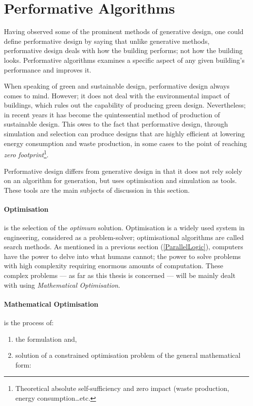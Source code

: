 \clearpage
\section{Performative Algorithms}

Having observed some of the prominent methods of generative design, one could define performative design by saying that unlike generative methods, performative design deals with how the building performs; not how the building looks. Performative algorithms examines a specific aspect of any given building's performance and improves it. 

When speaking of green and sustainable design, performative design always comes to mind. However; it does not deal with the environmental impact of buildings, which rules out the capability of producing green design. Nevertheless; in recent years it has become the quintessential method of production of sustainable design. This owes to the fact that performative design, through simulation and selection can produce designs that are highly efficient at lowering energy consumption and waste production, in some cases to the point of reaching \emph{zero footprint}\footnote{Theoretical absolute self-sufficiency and zero impact (waste production, energy consumption\ldots etc.}.

Performative design differs from generative design in that it does not rely solely on an algorithm for generation, but uses optimisation and simulation as tools. These tools are the main subjects of discussion in this section.

\paragraph{Optimisation}is the selection of the \emph{optimum} solution. Optimisation is a widely used system in engineering, considered as a problem-solver; optimisational algorithms are called search methods. As mentioned in a previous section (\ref{ParallelLogic}), computers have the power to delve into what humans cannot; the power to solve problems with high complexity requiring enormous amounts of computation. These complex problems --- as far as this thesis is concerned --- will be mainly dealt with using \emph{Mathematical Optimisation}.

\newpage
\paragraph{Mathematical Optimisation} is the process of:
\vspace{-0.5cm}
\begin{enumerate}
\item the formulation and,
\item solution of a constrained optimisation problem of the general mathematical form:
\end{enumerate}
\vspace{-0.9cm}

